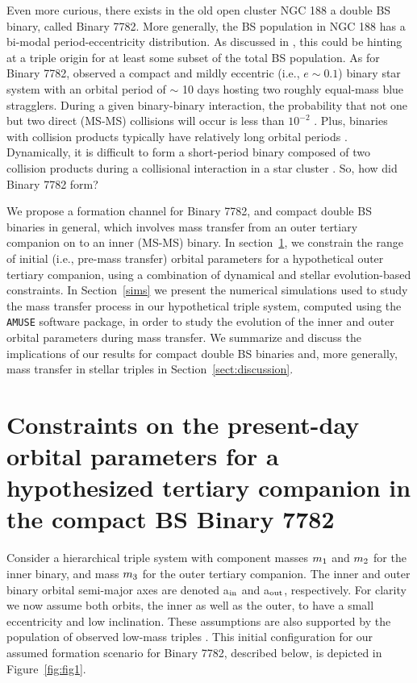 \documentclass{aastex62}
\begin{document}
Even more curious, there exists in the old open cluster NGC 188 a
double BS binary, called Binary 7782.  More generally, the BS
population in NGC 188 has a bi-modal period-eccentricity distribution.
As discussed in \citet{2011MNRAS.410.2370L}, this could be hinting at a triple
origin for at least some subset of the total BS population.  As for
Binary 7782, \citet{2009Natur.462.1032M} observed a compact and mildly eccentric
(i.e., $e \sim 0.1$) binary star system with an orbital period of
$\sim$ 10 days hosting two roughly equal-mass blue stragglers.  During
a given binary-binary interaction, the probability that not one but
two direct (MS-MS) collisions will occur is less than $10^{-2}$
\citep{1989AJ.....98..217L,2011MNRAS.410.2370L,2012MNRAS.425.2369L}.  Plus, binaries with collision products
typically have relatively long orbital periods
\cite{2011Sci...334.1380F}. Dynamically, it is difficult to form a
short-period binary composed of two collision products during a
collisional interaction in a star cluster \citep{2011Sci...334.1380F}.
So, how did Binary 7782 form?

We propose a formation channel for Binary 7782, and compact double BS
binaries in general, which involves mass transfer from an outer
tertiary companion on to an inner (MS-MS) binary.  In
section~\ref{sect:dyn}, we constrain the range of initial (i.e., pre-mass
transfer) orbital parameters for a hypothetical outer tertiary
companion, using a combination of dynamical and stellar
evolution-based constraints.  In Section~\ref{sims} we present the
numerical simulations used to study the mass transfer process in our
hypothetical triple system, computed using the
\texttt{AMUSE}\cite{AMUSE} software package, in order to study the
evolution of the inner and outer orbital parameters during mass
transfer.  We summarize and discuss the implications of our results
for compact double BS binaries and, more generally, mass transfer in
stellar triples in Section~\ref{sect:discussion}.

\section{Constraints on the present-day orbital parameters for a hypothesized
         tertiary companion in the compact BS Binary 7782} \label{sect:dyn}

Consider a hierarchical triple system with component masses $m_{\rm
  1}$ and $m_{\rm 2}$ for the inner binary, and mass $m_{\rm 3}$ for
the outer tertiary companion.  The inner and outer binary orbital
semi-major axes are denoted a$_{\rm in}$ and a$_{\rm out}$,
respectively.  For clarity we now assume both orbits, the inner as
well as the outer, to have a small eccentricity and low inclination.
These assumptions are also supported by the population of observed
low-mass triples \cite{2010yCat..73890925T,moe18}.  This initial
configuration for our assumed formation scenario for Binary 7782,
described below, is depicted in Figure~\ref{fig:fig1}.
\end{document}
